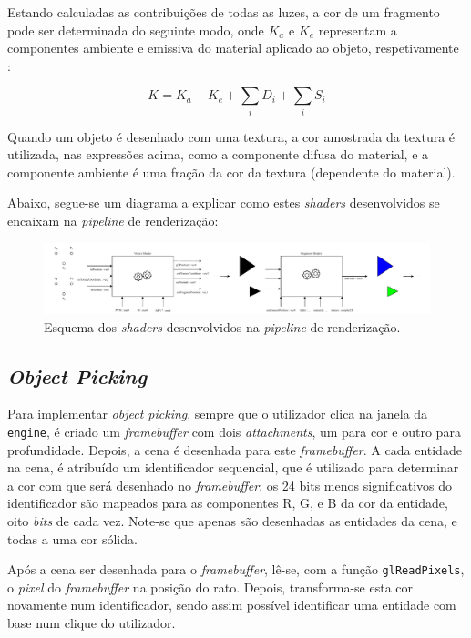 \documentclass[12pt, a4paper]{article}
\begin{document}
Estando calculadas as contribuições de todas as luzes, a cor de um fragmento pode ser determinada do
seguinte modo, onde $K_a$ e $K_e$ representam a componentes ambiente e emissiva do material aplicado
ao objeto, respetivamente \cite{learn-opengl-1} \cite{learn-opengl-3}:

$$
K = K_a + K_e + \sum_{i} D_i + \sum_{i} S_i
$$

Quando um objeto é desenhado com uma textura, a cor amostrada da textura é utilizada, nas
expressões acima, como a componente difusa do material, e a componente ambiente é uma fração da cor
da textura (dependente do material).

Abaixo, segue-se um diagrama a explicar como estes \emph{shaders} desenvolvidos se encaixam na
\emph{pipeline} de renderização:

\begin{figure}[H]
    \centering
    \includegraphics[width=\textwidth]{res/phase4/Shaders.pdf}
    \caption{Esquema dos \emph{shaders} desenvolvidos na \emph{pipeline} de renderização.}
\end{figure}

\subsection{\emph{Object Picking}}

Para implementar \emph{object picking}, sempre que o utilizador clica na janela da \texttt{engine},
é criado um \emph{framebuffer} com dois \emph{attachments}, um para cor e outro para profundidade.
Depois, a cena é desenhada para este \emph{framebuffer}. A cada entidade na cena, é atribuído um
identificador sequencial, que é utilizado para determinar a cor com que será desenhado no
\emph{framebuffer}: os 24 bits menos significativos do identificador são mapeados para as
componentes R, G, e B da cor da entidade, oito \emph{bits} de cada vez. Note-se que apenas são
desenhadas as entidades da cena, e todas a uma cor sólida.

Após a cena ser desenhada para o \emph{framebuffer}, lê-se, com a função \texttt{glReadPixels}, o
\emph{pixel} do \emph{framebuffer} na posição do rato. Depois, transforma-se esta cor novamente num
identificador, sendo assim possível identificar uma entidade com base num clique do utilizador.
\end{document}
